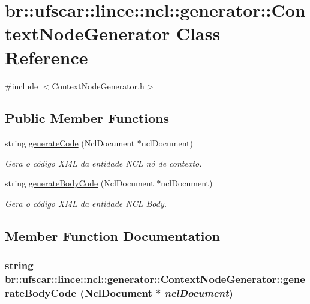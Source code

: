 \hypertarget{classbr_1_1ufscar_1_1lince_1_1ncl_1_1generator_1_1ContextNodeGenerator}{
\section{br::ufscar::lince::ncl::generator::ContextNodeGenerator Class Reference}
\label{classbr_1_1ufscar_1_1lince_1_1ncl_1_1generator_1_1ContextNodeGenerator}
}


{\ttfamily \#include $<$ContextNodeGenerator.h$>$}

\subsection*{Public Member Functions}
\begin{DoxyCompactItemize}
\item 
string \hyperlink{classbr_1_1ufscar_1_1lince_1_1ncl_1_1generator_1_1ContextNodeGenerator_af73e1f1278fd33b57e9c5b7b89b3c858}{generateCode} (NclDocument $\ast$nclDocument)
\begin{DoxyCompactList}\small\item\em Gera o código XML da entidade NCL nó de contexto. \item\end{DoxyCompactList}\item 
string \hyperlink{classbr_1_1ufscar_1_1lince_1_1ncl_1_1generator_1_1ContextNodeGenerator_ac946149e01034350db148f930ded7338}{generateBodyCode} (NclDocument $\ast$nclDocument)
\begin{DoxyCompactList}\small\item\em Gera o código XML da entidade NCL Body. \item\end{DoxyCompactList}\end{DoxyCompactItemize}


\subsection{Member Function Documentation}
\hypertarget{classbr_1_1ufscar_1_1lince_1_1ncl_1_1generator_1_1ContextNodeGenerator_ac946149e01034350db148f930ded7338}{
\subsubsection[{generateBodyCode}]{\setlength{\rightskip}{0pt plus 5cm}string br::ufscar::lince::ncl::generator::ContextNodeGenerator::generateBodyCode (NclDocument $\ast$ {\em nclDocument})}}
\label{classbr_1_1ufscar_1_1lince_1_1ncl_1_1generator_1_1ContextNodeGenerator_ac946149e01034350db148f930ded7338}


